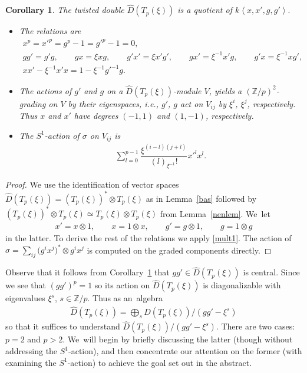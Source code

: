 \documentclass[11pt]{article}
\numberwithin{equation}{section}
\numberwithin{equation}{section}
\newtheorem{Corollary}[Theorem]{Corollary}
\newcommand{\ot}{\otimes}
\newcommand{\zp}{\mathbb{Z}/p}
\begin{document}
\begin{Corollary}\label{gens}The twisted double $\widehat{D}(T_p(\xi))$ is a quotient of $k\left\langle x,x',g,g'\right\rangle.$

\begin{itemize}\itemsep=0pt
\item The relations are
\begin{gather*}
x^p=x'^p=g^p-1=g'^p-1=0,
\\
gg'=g'g,\qquad
gx=\xi xg,\qquad
g'x'=\xi x'g',\qquad
gx'=\xi^{-1} x'g, \qquad
g'x=\xi^{-1} xg',
\\
xx'-\xi^{-1}x'x=1-\xi^{-1}g'^{-1}g.
\end{gather*}

\item The actions of $g'$ and $g$ on a $\widehat{D}(T_p(\xi))$-module $V$, yields a $(\mathbb{Z}/p)^2$-grading on $V$ by their eigenspaces, i.e., $g'$, $g$ act on $V_{ij}$ by $\xi^i$, $\xi^j$, respectively. Thus $x$ and $x'$ have degrees $(-1,1)$ and $(1,-1)$, respectively.

\item The $S^1$-action of $\sigma$ on $V_{ij}$ is
\begin{gather}\label{sigmaaction}
\sum_{l=0}^{p-1}\dfrac{\xi^{(i-l)(j+l)}}{(l)_{\xi^{-1}}!}x'^lx^l.
\end{gather}
\end{itemize}
\end{Corollary}

\begin{proof}
We use the identification of vector spaces $\widehat{D}(T_p(\xi))=(T_p(\xi))^*\ot T_p(\xi)$ as in Lemma~\ref{bas} followed by $(T_p(\xi))^*\ot T_p(\xi) \simeq T_p(\xi)\ot T_p(\xi)$ from Lemma~\ref{nenlem}. We~let
\begin{gather}
x'=x\ot 1, \qquad
x=1\ot x, \qquad
g'=g\ot 1, \qquad
g=1\ot g
\end{gather}
in the latter. To derive the rest of the relations we apply \eqref{mult1}. The action of $\sigma=\sum_{ij}\big(g^ix^j\big)^*\ot g^ix^j$ is computed on the graded components directly.
\end{proof}

Observe that it follows from Corollary~\ref{gens} that $gg'\in\widehat{D}(T_p(\xi))$ is central. Since we see that $(gg')^p=1$ so its action on $\widehat{D}(T_p(\xi))$ is diagonalizable with eigenvalues $\xi^s$, $s\in\zp$. Thus as an~algebra
\begin{gather}\label{split}
\widehat{D}(T_p(\xi))=\bigoplus_s \widehat{D}(T_p(\xi))/(gg'-\xi^s)
\end{gather}
so that it suffices to understand $\widehat{D}(T_p(\xi))/(gg'-\xi^s)$. There are two cases: $p=2$ and $p>2$. We~will begin by briefly discussing the latter (though without addressing the $S^1$-action), and then concentrate our attention on the former (with examining the $S^1$-action) to achieve the goal set out in the abstract.
\end{document}
